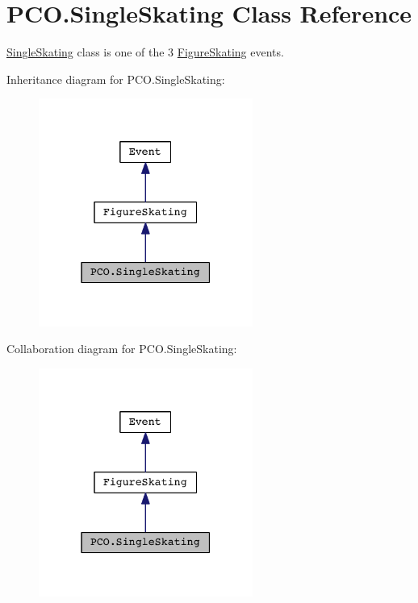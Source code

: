 \hypertarget{classPCO_1_1SingleSkating}{\section{P\+C\+O.\+Single\+Skating Class Reference}
\label{classPCO_1_1SingleSkating}
}


\hyperlink{classPCO_1_1SingleSkating}{Single\+Skating} class is one of the 3 \hyperlink{classPCO_1_1FigureSkating}{Figure\+Skating} events.  




Inheritance diagram for P\+C\+O.\+Single\+Skating\+:\nopagebreak
\begin{figure}[H]
\begin{center}
\leavevmode
\includegraphics[width=199pt]{classPCO_1_1SingleSkating__inherit__graph}
\end{center}
\end{figure}


Collaboration diagram for P\+C\+O.\+Single\+Skating\+:\nopagebreak
\begin{figure}[H]
\begin{center}
\leavevmode
\includegraphics[width=199pt]{classPCO_1_1SingleSkating__coll__graph}
\end{center}
\end{figure}
